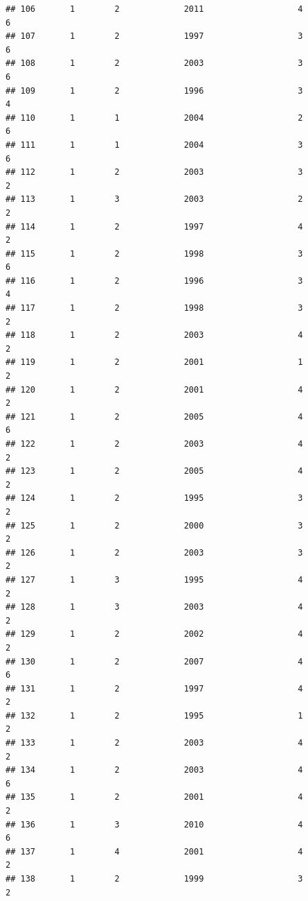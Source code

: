 \documentclass[
]{article}
\begin{document}
\begin{verbatim}
## 106       1        2             2011                   4                 6
## 107       1        2             1997                   3                 6
## 108       1        2             2003                   3                 6
## 109       1        2             1996                   3                 4
## 110       1        1             2004                   2                 6
## 111       1        1             2004                   3                 6
## 112       1        2             2003                   3                 2
## 113       1        3             2003                   2                 2
## 114       1        2             1997                   4                 2
## 115       1        2             1998                   3                 6
## 116       1        2             1996                   3                 4
## 117       1        2             1998                   3                 2
## 118       1        2             2003                   4                 2
## 119       1        2             2001                   1                 2
## 120       1        2             2001                   4                 2
## 121       1        2             2005                   4                 6
## 122       1        2             2003                   4                 2
## 123       1        2             2005                   4                 2
## 124       1        2             1995                   3                 2
## 125       1        2             2000                   3                 2
## 126       1        2             2003                   3                 2
## 127       1        3             1995                   4                 2
## 128       1        3             2003                   4                 2
## 129       1        2             2002                   4                 2
## 130       1        2             2007                   4                 6
## 131       1        2             1997                   4                 2
## 132       1        2             1995                   1                 2
## 133       1        2             2003                   4                 2
## 134       1        2             2003                   4                 6
## 135       1        2             2001                   4                 2
## 136       1        3             2010                   4                 6
## 137       1        4             2001                   4                 2
## 138       1        2             1999                   3                 2

\end{verbatim}
\end{document}
